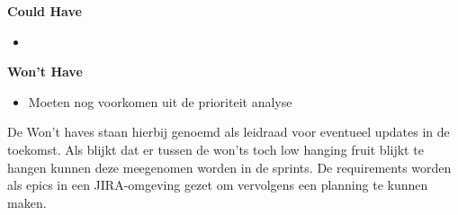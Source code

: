 \textbf{Could Have}
\begin{itemize}
    \item
\end{itemize}

\textbf{Won't Have}
\begin{itemize}
    \item Moeten nog voorkomen uit de prioriteit analyse
\end{itemize}
De Won't haves staan hierbij genoemd als leidraad voor eventueel updates in de toekomst.
Als blijkt dat er tussen de won'ts toch low hanging fruit blijkt te hangen kunnen deze meegenomen worden in de sprints.
De requirements worden als epics in een JIRA-omgeving gezet om vervolgens een planning te kunnen maken.



